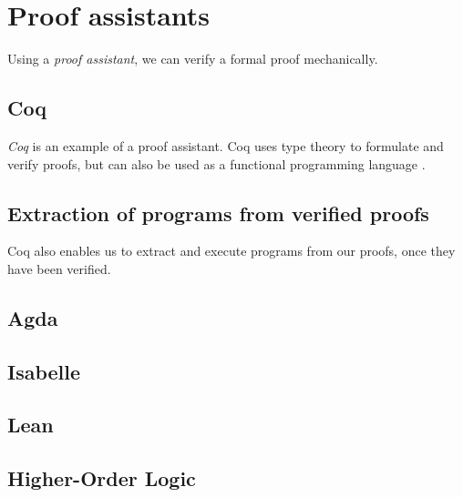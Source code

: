 \section{Proof assistants}

Using a \textit{proof assistant}, we can verify a formal proof mechanically.

\subsection{Coq}
\textit{Coq} is an example of a proof assistant.
Coq uses type theory to formulate and verify proofs, but can also be used as a functional programming language \cite{cintro}.

\subsection{Extraction of programs from verified proofs}

Coq also enables us to extract and execute programs from our proofs, once they have been verified.

\subsection{Agda}

\subsection{Isabelle}

\subsection{Lean}

\subsection{Higher-Order Logic}
